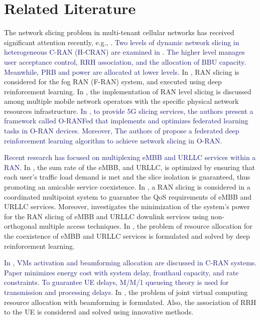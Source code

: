 \documentclass[lettersize,journal]{IEEEtran}
\begin{document}
\section{Related Literature}\label{RL}
The network slicing problem in multi-tenant cellular networks has received significant attention recently, e.g.,  \cite{feng2020dynamic,lee2018dynamic,lee2016new}.
\textcolor{MidnightBlue}{Two levels of dynamic network slicing in heterogeneous C-RAN (H-CRAN) are examined in \cite{lee2018dynamic}. The higher level manages user acceptance control, RRH association, and the allocation of BBU capacity. Meanwhile, PRB and power are allocated at lower levels.}
In \cite{xiang2020realization}, RAN slicing is considered for the fog RAN (F-RAN) system, and executed using deep reinforcement learning. In \cite{elayoubi20195g,d2020toward}, the implementation of RAN level slicing is discussed among multiple mobile network operators with the specific physical network resources infrastructure.
\textcolor{MidnightBlue}{ In \cite{singh2022joint}, to provide 5G slicing services, the authors present a framework called O-RANFed that implements and optimizes federated learning tasks in O-RAN devices.}
\textcolor{MidnightBlue}{ Moreover, The authors of \cite{zhang2022federated} propose a federated deep reinforcement learning algorithm to achieve network slicing in O-RAN.}

\textcolor{MidnightBlue}{ Recent research has focused on multiplexing eMBB and URLLC services within a RAN.}
In \cite{setayesh2020joint}, the sum rate of the eMBB, and URLLC, is optimized by ensuring that each user's traffic load demand is met and the slice isolation is guaranteed, thus promoting an amicable service coexistence.
In \cite{yang2020should}, a RAN slicing is considered in a coordinated multipoint system to guarantee the QoS requirements of eMBB and URLLC services. Moreover, \cite{saggese2021power} investigates the minimization of the system's power for the  RAN slicing of eMBB and URLLC downlink services using non-orthogonal multiple access techniques.
In \cite{alsenwi2021intelligent}, the problem of resource allocation for the coexistence of eMBB and URLLC services is formulated and solved by deep reinforcement learning.
 
\textcolor{MidnightBlue}{In \cite{SystemCostMinimization,guo2016exploiting}, VMs activation and beamforming allocation are discussed in C-RAN systems.
Paper \cite{SystemCostMinimization} minimizes energy cost with system delay, fronthaul capacity, and rate constraints.
To guarantee UE delays, M/M/1 queueing theory is used for transmission and processing delays.}
In \cite{luong2018joint,luong2018novel}, the problem of joint virtual computing resource allocation with beamforming is formulated. Also, the association of RRH to the UE is considered and solved using innovative methods.
\end{document}
